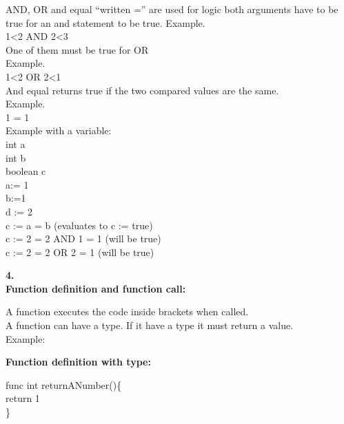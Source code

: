 AND, OR  and equal “written =” are used for logic
both arguments have to be true for an and statement to be true.
Example.\\
1<2 AND 2<3\\
One of them must be true for OR\\
Example.\\
1<2 OR 2<1\\
And equal returns true if the two compared values are the same.\\
Example.\\
1 = 1\\
Example with a variable:\\
int a\\
int b\\
boolean c\\
a:= 1\\
b:=1\\
d := 2\\
c :=  a = b (evaluates to c := true)\\
c := 2 = 2 AND 1 = 1   (will be true)\\
c := 2 = 2 OR 2 = 1    (will be true)
\begin{flushleft}
\textbf{4.}\\
\textbf{Function definition and function call:}
\end{flushleft}
  A function executes the code inside {} brackets when called.\\
  A function can have a type. If it have a type it must return a value.\\
  Example:
 \begin{flushleft}
 \textbf{Function definition with type:}
 \end{flushleft}
func int returnANumber()\{\\
\hspace*{12mm}	return 1\\
\}

